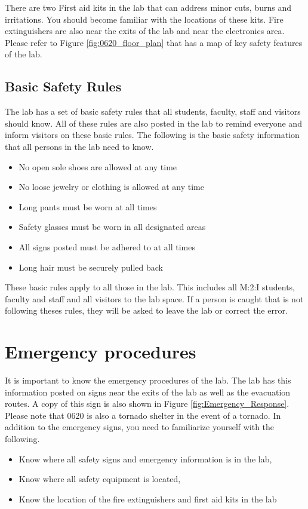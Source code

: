 There are two First aid kits in the lab that can address minor cuts, burns and irritations.  You should become familiar with the locations of these kits. Fire extinguishers are also near the exits of the lab and near the electronics area. Please refer to Figure \ref{fig:0620_floor_plan} that has a map of key safety features of the lab.

\subsection{Basic Safety Rules}
The lab has a set of basic safety rules that all students, faculty, staff and visitors should know.  All of these rules are also posted in the lab to remind everyone and inform visitors on these basic rules.  The following is the basic safety information that all persons in the lab need to know.

\begin{itemize}
\item No open sole shoes are allowed at any time
\item No loose jewelry or clothing is allowed at any time
\item Long pants must be worn at all times
\item Safety glasses must be worn in all designated areas
\item All signs posted must be adhered to at all times
\item Long hair must be securely pulled back
\end{itemize}

These basic rules apply to all those in the lab.  This includes all M:2:I students, faculty and staff and all visitors to the lab space.  If a person is caught that is not following theses rules, they will be asked to leave the lab or correct the error.

\section{Emergency procedures}
It is important to know the emergency procedures of the lab.  The lab has this information posted on signs near the exits of the lab as well as the evacuation routes.  A copy of this sign is also shown in Figure \ref{fig:Emergency_Response}. Please note that 0620 is also a tornado shelter in the event of a tornado.  In addition to the emergency signs, you need to familiarize yourself with the following.
\begin{itemize}
\item Know where all safety signs and emergency information is in the lab,
\item Know where all safety equipment is located,
\item Know the location of the fire extinguishers and first aid kits in the lab
\end{itemize}

